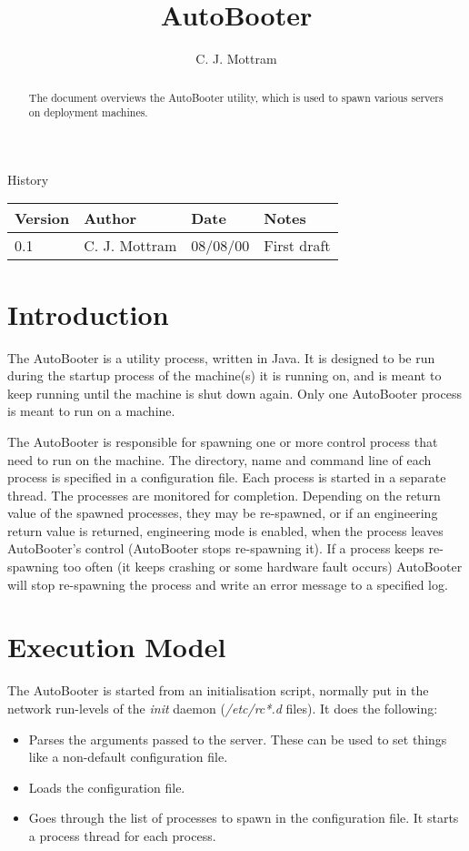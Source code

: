 \documentclass[10pt,a4paper]{article}
\title{AutoBooter}
\author{C. J. Mottram}
\date{}
\begin{document}
\thispagestyle{empty}
\maketitle
\begin{abstract}
The document overviews the AutoBooter utility, which is used to spawn
various servers on deployment machines.
\end{abstract}

\centerline{\Large History}
\begin{center}
\begin{tabular}{|l|l|l|p{15em}|}
\hline
{\bf Version} & {\bf Author} & {\bf Date} & {\bf Notes} \\
\hline
0.1 &              C. J. Mottram & 08/08/00 & First draft \\
\hline
\end{tabular}
\end{center}

\newpage
\tableofcontents
\listoffigures
\listoftables
\newpage

\section{Introduction}
The AutoBooter is a utility process, written in Java. It is designed to be run during the startup process of the
machine(s) it is running on, and is meant to keep running until the machine is shut down again. Only one AutoBooter
process is meant to run on a machine.

The AutoBooter is responsible for spawning one or more control process that need to run on the machine. The directory,
name and command line of each process is specified in a configuration file. Each process is started in a separate 
thread. The processes are monitored for completion. Depending on the return value of the spawned processes,
they may be re-spawned, or if an engineering return value is returned, engineering mode is enabled, when the
process leaves AutoBooter's control (AutoBooter stops re-spawning it). If a process keeps re-spawning too often
(it keeps crashing or some hardware fault occurs) AutoBooter will stop re-spawning the process and write an
error message to a specified log.

\section{Execution Model}
The AutoBooter is started from an initialisation script, normally put in the network run-levels of the 
{\em init} daemon ({\em /etc/rc*.d} files). It does the following:
\begin{itemize}
\item Parses the arguments passed to the server. These can be used to set things like a non-default configuration file.
\item Loads the configuration file.
\item Goes through the list of processes to spawn in the configuration file. It starts a process thread for
	each process.
\end{itemize}
\end{document}
